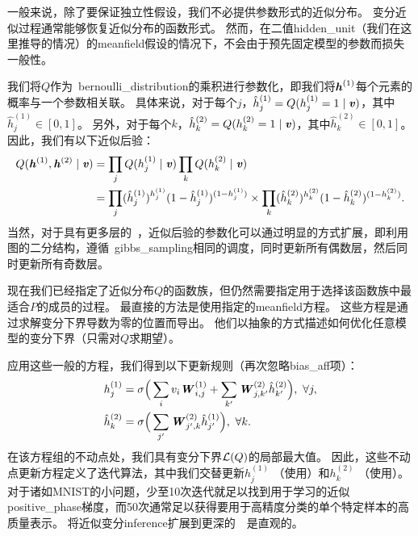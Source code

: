 一般来说，除了要保证独立性假设，我们不必提供参数形式的近似分布。
变分近似过程通常能够恢复近似分布的函数形式。
然而，在二值\gls{hidden_unit}（我们在这里推导的情况）的\gls{meanfield}假设的情况下，不会由于预先固定模型的参数而损失一般性。

我们将$Q$作为~\gls{bernoulli_distribution}的乘积进行参数化，即我们将$\boldsymbol{\mathit{h}}^{(1)}$每个元素的概率与一个参数相关联。
具体来说，对于每个$j$，$\hat h_j^{(1)} = Q(h_j^{(1)}=1 \mid  \boldsymbol{\mathit{v}})$，其中$\hat h_j^{(1)} \in [0,1]$。
另外，对于每个$k$，$\hat h_k^{(2)} = Q(h_k^{(2)}=1 \mid  \boldsymbol{\mathit{v}})$，其中$\hat h_k^{(2)} \in [0,1]$。
因此，我们有以下近似后验：
\begin{align}
 Q(\boldsymbol{\mathit{h}}^{(1)}, \boldsymbol{\mathit{h}}^{(2)}  \mid  \boldsymbol{\mathit{v}}) &=  \prod_j Q(h_j^{(1)} \mid  \boldsymbol{\mathit{v}}) \prod_k Q(h_k^{(2)}  \mid  \boldsymbol{\mathit{v}}) \\
 &= \prod_j (\hat h_j^{(1)})^{h_j^{(1)}}(1-\hat h_j^{(1)})^{(1-h_j^{(1)})} \times
 \prod_k (\hat h_k^{(2)})^{h_k^{(2)}}(1-\hat h_k^{(2)})^{(1-h_k^{(2)})} .
\end{align}
当然，对于具有更多层的~，近似后验的参数化可以通过明显的方式扩展，即利用图的二分结构，遵循~\gls{gibbs_sampling}相同的调度，同时更新所有偶数层，然后同时更新所有奇数层。


现在我们已经指定了近似分布$Q$的函数族，但仍然需要指定用于选择该函数族中最适合$P$的成员的过程。
最直接的方法是使用指定的\gls{meanfield}方程。
这些方程是通过求解变分下界导数为零的位置而导出。
他们以抽象的方式描述如何优化任意模型的变分下界（只需对$Q$求期望）。

应用这些一般的方程，我们得到以下更新规则（再次忽略\gls{bias_aff}项）：
\begin{align} \label{eq:2033h1}
 h_j^{(1)} &= \sigma  \Big(  \sum_i v_i \boldsymbol{\mathit{W}}_{i,j}^{(1)} 
 + \sum_{k^{\prime}} \boldsymbol{\mathit{W}}_{j,k^{\prime}}^{(2)} \hat h_{k^{\prime}}^{(2)}  \Big), ~\forall j ,\\
 \label{eq:2034h2}
 \hat h_{k}^{(2)} &=  \sigma  \Big(  \sum_{j^{\prime}} \boldsymbol{\mathit{W}}_{j^{\prime},k}^{(2)}
 \hat h_{j^{\prime}}^{(1)}  \Big), ~\forall k.
\end{align}
在该方程组的不动点处，我们具有变分下界$\mathcal{L}(Q)$的局部最大值。
因此，这些不动点更新方程定义了迭代算法，其中我们交替更新$h_{j}^{(1)} $ （使用）和$h_{k}^{(2)} $ （使用）。
对于诸如MNIST的小问题，少至10次迭代就足以找到用于学习的近似\gls{positive_phase}梯度，而50次通常足以获得要用于高精度分类的单个特定样本的高质量表示。
将近似变分\gls{inference}扩展到更深的~~是直观的。


